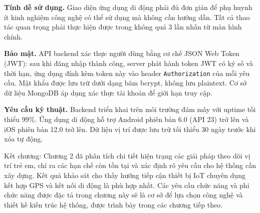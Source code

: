 \documentclass[../DoAn.tex]{subfiles}
\begin{document}
\textbf{Tính dễ sử dụng.} Giao diện ứng dụng di động phải đủ đơn giản để phụ huynh ít kinh nghiệm công nghệ có thể sử dụng mà không cần hướng dẫn. Tất cả thao tác quan trọng phải thực hiện được trong không quá 3 lần nhấn từ màn hình chính.

\textbf{Bảo mật.} API backend xác thực người dùng bằng cơ chế JSON Web Token (JWT): sau khi đăng nhập thành công, server phát hành token JWT có ký số và thời hạn, ứng dụng đính kèm token này vào header \texttt{Authorization} của mỗi yêu cầu. Mật khẩu được lưu trữ dưới dạng băm bcrypt, không lưu plaintext. Cơ sở dữ liệu MongoDB áp dụng xác thực tài khoản để giới hạn truy cập.

\textbf{Yêu cầu kỹ thuật.} Backend triển khai trên môi trường đám mây với uptime tối thiểu 99\%. Ứng dụng di động hỗ trợ Android phiên bản 6.0 (API 23) trở lên và iOS phiên bản 12.0 trở lên. Dữ liệu vị trí được lưu trữ tối thiểu 30 ngày trước khi xóa tự động.

Kết chương: Chương 2 đã phân tích chi tiết hiện trạng các giải pháp theo dõi vị trí trẻ em, chỉ ra các hạn chế còn tồn tại và xác định rõ yêu cầu cho hệ thống cần xây dựng. Kết quả khảo sát cho thấy hướng tiếp cận thiết bị IoT chuyên dụng kết hợp GPS và kết nối di động là phù hợp nhất. Các yêu cầu chức năng và phi chức năng được đặc tả trong chương này sẽ là cơ sở để lựa chọn công nghệ và thiết kế kiến trúc hệ thống, được trình bày trong các chương tiếp theo.
\end{document}
